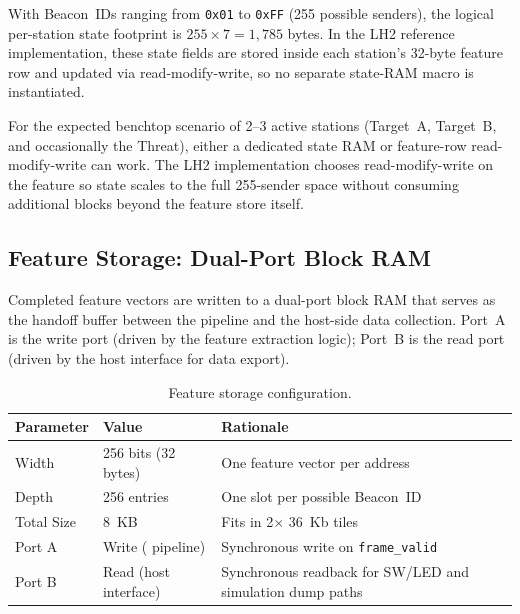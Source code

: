 \documentclass[11pt,letterpaper]{article}
\begin{document}
	With Beacon~IDs ranging from \texttt{0x01} to \texttt{0xFF} (255 possible senders), the logical per-station state footprint is $255 \times 7 = 1{,}785$ bytes. In the LH2 reference implementation, these state fields are stored inside each station's 32-byte feature row and updated via read-modify-write, so no separate state-RAM macro is instantiated.

	\begin{tcolorbox}[infobox={Design Choice: Logical State vs. Separate State RAM}]
		For the expected benchtop scenario of 2--3 active stations (Target~A, Target~B, and occasionally the Threat), either a dedicated state RAM or feature-row read-modify-write can work. The LH2 implementation chooses read-modify-write on the feature \BRAM{} so state scales to the full 255-sender space without consuming additional \BRAM{} blocks beyond the feature store itself.
	\end{tcolorbox}

	\subsection{Feature Storage: Dual-Port Block RAM}

	Completed feature vectors are written to a dual-port block RAM that serves as the handoff buffer between the \FPGA{} pipeline and the host-side \ML{} data collection. Port~A is the \FPGA{} write port (driven by the feature extraction logic); Port~B is the read port (driven by the host interface for data export).

	\begin{table}[ht!]
		\centering
		\caption{Feature storage \BRAM{} configuration.}
		\label{tab:feature_bram}
		\renewcommand{\arraystretch}{1.3}
		\begin{tabular}{l l l}
			\toprule
			\textbf{Parameter} & \textbf{Value} & \textbf{Rationale} \\
			\midrule
			Width & 256 bits (32 bytes) & One feature vector per address \\
			Depth & 256 entries & One slot per possible Beacon~ID \\
			Total Size & 8~KB & Fits in 2$\times$ 36~Kb \BRAM{} tiles \\
			Port A & Write (\FPGA{} pipeline) & Synchronous write on \texttt{frame\_valid} \\
			Port B & Read (host interface) & Synchronous readback for SW/LED and simulation dump paths \\
			\bottomrule
		\end{tabular}
	\end{table}
\end{document}
